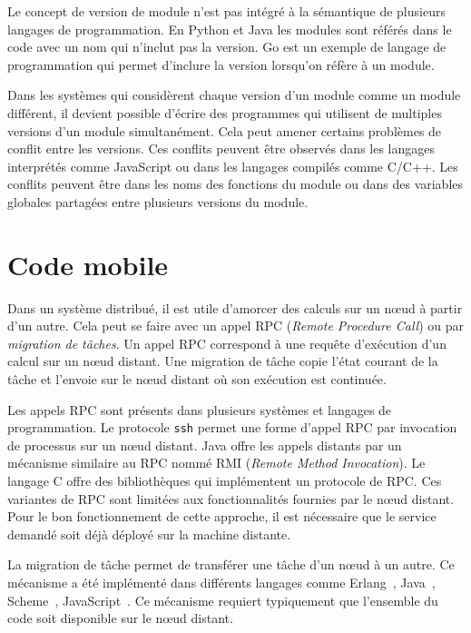 
Le concept de version de module n'est pas intégré à la sémantique de
plusieurs langages de programmation.  En Python et Java les
modules sont référés dans le code avec un nom qui n'inclut pas la
version.  Go est un exemple de langage de programmation qui
permet d'inclure la version lorsqu'on réfère à un module.

Dans les systèmes qui considèrent chaque version d'un module comme un
module différent, il devient possible d'écrire des programmes qui
utilisent de multiples versions d'un module simultanément. Cela peut
amener certains problèmes de conflit entre les versions. Ces conflits
peuvent être observés dans les langages interprétés comme JavaScript
ou dans les langages compilés comme C/C++. Les conflits peuvent être
dans les noms des fonctions du module ou dans des variables globales
partagées entre plusieurs versions du module.


\section{Code mobile}

Dans un système distribué, il est utile d'amorcer des calculs sur un
nœud à partir d'un autre.
Cela peut se faire avec un appel RPC (\textit{Remote
Procedure Call}) ou par \textit{migration de tâches}.  Un appel RPC correspond
à une requête d'exécution d'un calcul sur un nœud distant. Une migration de
tâche copie l'état courant de la tâche et l'envoie sur le nœud distant où son
exécution est continuée.

Les appels RPC sont présents dans plusieurs systèmes et langages de
programmation.  Le protocole \texttt{ssh} permet une forme d'appel RPC par
invocation de processus sur un nœud distant. Java offre les appels distants par un
mécanisme similaire au RPC nommé RMI (\textit{Remote Method Invocation}).
Le langage C offre des bibliothèques qui implémentent un protocole de RPC.
Ces variantes de RPC sont limitées aux fonctionnalités fournies par le nœud distant.
Pour le bon fonctionnement de cette approche, il est nécessaire que le
service demandé soit déjà déployé sur la machine distante.

La migration de tâche permet de transférer une tâche d'un nœud à un autre.  Ce
mécanisme a été implémenté dans différents langages comme
Erlang~\cite{M_mobileintelligent}, Java~\cite{And98transparentmigration},
Scheme~\cite{Sumii00animplementation,DBLP:conf/erlang/Germain06},
JavaScript~\cite{DEV2017transparentmigration}. Ce mécanisme requiert
typiquement que l'ensemble du code soit disponible sur le nœud distant.

